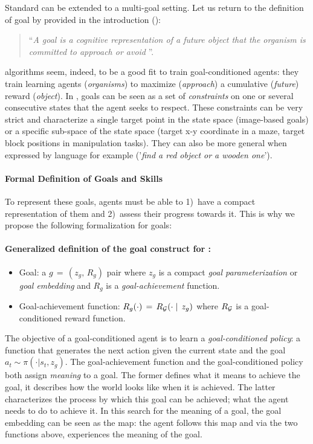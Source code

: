 Standard \rl can be extended to a multi-goal setting. Let us return to the definition of goal by \citet{elliot2008goal} provided in the introduction ():
\begin{quote}
   	``\textit{A goal is a cognitive representation of a future object that the organism is committed to approach or
    avoid} ''.
\end{quote}
\rl algorithms seem, indeed, to be a good fit to train goal-conditioned agents: they train learning agents (\textit{organisms}) to maximize (\textit{approach}) a cumulative (\textit{future}) reward (\textit{object}). In \rl, goals can be seen as a set of \textit{constraints} on one or several consecutive states that the agent seeks to respect. These constraints can be very strict and characterize a single target point in the state space (\eg image-based goals) or a specific sub-space of the state space (\eg target x-y coordinate in a maze, target block positions in manipulation tasks). They can also be more general when expressed by language for example (\eg '\textit{find a red object or a wooden one}'). 

\paragraph{Formal Definition of Goals and Skills}

To represent these goals, \rl agents must be able to 1)~have a compact representation of them and 2)~assess their progress towards it. This is why we propose the following formalization for \rl goals: 

\begin{tcolorbox}
\small
\paragraph{Generalized definition of the goal construct for \rl:}
\begin{itemize}
    \item \gls{Goal}: a $g\,=\,(z_g,\,R_g)$ pair where $z_g$ is a compact \textit{goal parameterization} or \textit{goal embedding} and $R_g$ is a \textit{goal-achievement} function.
    \item \gls{Goal-achievement function}: $R_g(\cdot)\,=\,R_{\mathcal{G}}(\cdot\mid\,z_g)$ where $R_{\mathcal{G}}$ is a goal-conditioned reward function.
\end{itemize}
\end{tcolorbox}

The objective of a goal-conditioned agent is to learn a \textit{goal-conditioned policy}: a function that generates the next action given the current state and the goal $a_t \sim \pi(\cdot|s_t,z_g)$. The goal-achievement function and the goal-conditioned policy both assign \textit{meaning} to a goal. The former defines what it means to achieve the goal, it describes how the world looks like when it is achieved. The latter characterizes the process by which this goal can be achieved; what the agent needs to do to achieve it. In this search for the meaning of a goal, the goal embedding can be seen as the map: the agent follows this map and via the two functions above, experiences the meaning of the goal.


